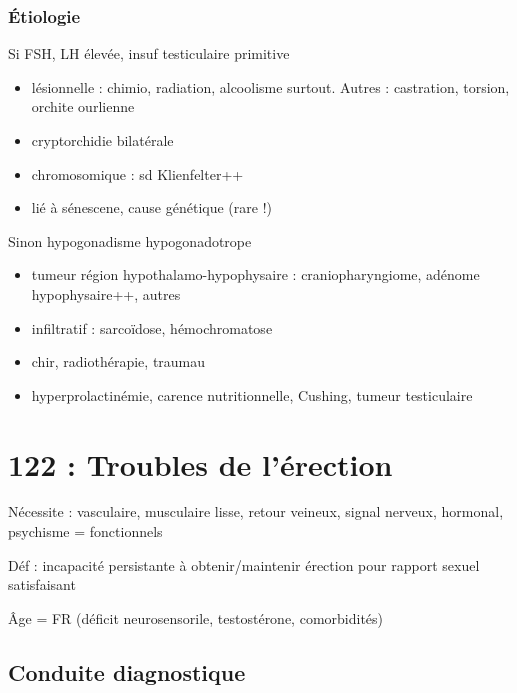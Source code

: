 \documentclass[11pt]{article}
\begin{document}
\subsubsection{Étiologie}
\label{sec:orgce40b68}
Si FSH, LH élevée, insuf testiculaire primitive 
\begin{itemize}
\item lésionnelle : chimio, radiation, alcoolisme surtout. Autres : castration,
torsion, orchite ourlienne
\item cryptorchidie bilatérale
\item chromosomique : sd Klienfelter++
\item lié à sénescene, cause génétique (rare !)
\end{itemize}
Sinon hypogonadisme hypogonadotrope 
\begin{itemize}
\item tumeur région hypothalamo-hypophysaire : craniopharyngiome, adénome
hypophysaire++, autres
\item infiltratif : sarcoïdose, hémochromatose
\item chir, radiothérapie, traumau
\item hyperprolactinémie, carence nutritionnelle, Cushing, tumeur testiculaire
\end{itemize}

\section{122 : Troubles de l'érection}
\label{sec:org0f0682e}
Nécessite : vasculaire, musculaire lisse, retour veineux, signal  nerveux,
hormonal, psychisme = fonctionnels

Déf : incapacité persistante à obtenir/maintenir érection pour rapport sexuel satisfaisant

Âge = FR (déficit neurosensorile, \inc testostérone, comorbidités)

\subsection{Conduite  diagnostique}
\label{sec:orgeeedeff}
\end{document}
